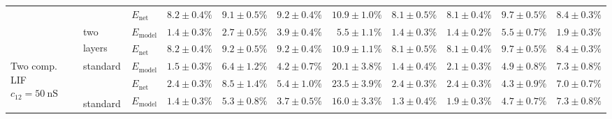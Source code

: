 \begin{sidewaystable}
\begin{tabular}{p{2.2cm} p{1.7cm} l r r r r r r r r }
	\\
	& & 
	$E_\mathrm{net}$ &
	\cellcolor{White!19!SteelBlue}$8.2 \pm 0.4\%$ & \cellcolor{White!75!SteelBlue}$9.1 \pm 0.5\%$ & \cellcolor{White!38!SteelBlue}$9.2 \pm 0.4\%$ & \cellcolor{White!94!SteelBlue}$10.9 \pm 1.0\%$ & \cellcolor{White!32!SteelBlue}$8.1 \pm 0.5\%$ & \cellcolor{White!38!SteelBlue}$8.1 \pm 0.4\%$ & \cellcolor{White!32!SteelBlue}$9.7 \pm 0.5\%$ & \cellcolor{White!69!SteelBlue}$8.4 \pm 0.3\%$
	\\\cmidrule(l){2-11}
	&
	\multirow{2}{1.7cm}{\raggedleft two layers\textsuperscript{\dag}} &
	$E_\mathrm{model}$ & 
	\color{Gray}$1.4 \pm 0.3\%$ & \color{Gray}$\mathbf{2.7 \pm 0.5\%}$ & \color{Gray}$3.9 \pm 0.4\%$ & \color{Gray}$\mathbf{5.5 \pm 1.1\%}$ & \color{Gray}$1.4 \pm 0.3\%$ & \color{Gray}$\mathbf{1.4 \pm 0.2\%}$ & \color{Gray}$5.5 \pm 0.7\%$ & \color{Gray}$\mathbf{1.9 \pm 0.3\%}$
	\\
	& & 
	$E_\mathrm{net}$ &
	\cellcolor{White!25!SteelBlue}$8.2 \pm 0.4\%$ & \cellcolor{White!69!SteelBlue}$9.2 \pm 0.5\%$ & \cellcolor{White!32!SteelBlue}$9.2 \pm 0.4\%$ & \cellcolor{White!100!SteelBlue}$\mathbf{10.9 \pm 1.1\%}$ & \cellcolor{White!38!SteelBlue}$8.1 \pm 0.5\%$ & \cellcolor{White!32!SteelBlue}$8.1 \pm 0.4\%$ & \cellcolor{White!38!SteelBlue}$9.7 \pm 0.5\%$ & \cellcolor{White!75!SteelBlue}$8.4 \pm 0.3\%$
	\\\midrule
	\multirow{8}{2.2cm}{\raggedleft %
	Two comp. LIF $c_{12} = \SI{50}{\nano\siemens}$} &
	\multirow{2}{1.7cm}{\raggedleft %
	standard} &
	$E_\mathrm{model}$ & 
	\color{Gray}$1.5 \pm 0.3\%$ & \color{Gray}$6.4 \pm 1.2\%$ & \color{Gray}$4.2 \pm 0.7\%$ & \color{Gray}$20.1 \pm 3.8\%$ & \color{Gray}$1.4 \pm 0.4\%$ & \color{Gray}$2.1 \pm 0.3\%$ & \color{Gray}$4.9 \pm 0.8\%$ & \color{Gray}$7.3 \pm 0.8\%$
	\\
	& & 
	$E_\mathrm{net}$ &
	\cellcolor{White!94!SteelBlue}$2.4 \pm 0.3\%$ & \cellcolor{White!82!SteelBlue}$8.5 \pm 1.4\%$ & \cellcolor{White!94!SteelBlue}$5.4 \pm 1.0\%$ & \cellcolor{White!44!SteelBlue}$23.5 \pm 3.9\%$ & \cellcolor{White!94!SteelBlue}$2.4 \pm 0.3\%$ & \cellcolor{White!94!SteelBlue}$2.4 \pm 0.3\%$ & \cellcolor{White!94!SteelBlue}$4.3 \pm 0.9\%$ & \cellcolor{White!82!SteelBlue}$7.0 \pm 0.7\%$
	\\\cmidrule(l){2-11}
	&
	\multirow{2}{1.7cm}{\raggedleft %
	standard\textsuperscript{\dag}} &
	$E_\mathrm{model}$ & 
	\color{Gray}$1.4 \pm 0.3\%$ & \color{Gray}$5.3 \pm 0.8\%$ & \color{Gray}$3.7 \pm 0.5\%$ & \color{Gray}$16.0 \pm 3.3\%$ & \color{Gray}$1.3 \pm 0.4\%$ & \color{Gray}$1.9 \pm 0.3\%$ & \color{Gray}$4.7 \pm 0.7\%$ & \color{Gray}$7.3 \pm 0.8\%$

\end{tabular}
\end{sidewaystable}
